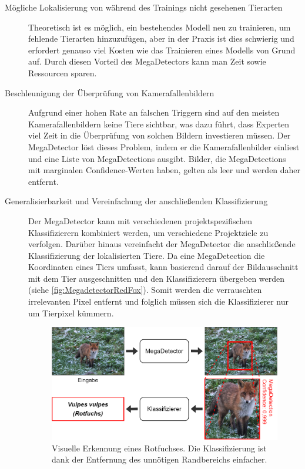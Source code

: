 \begin{description}
	\item[Mögliche Lokalisierung von während des Trainings nicht gesehenen Tierarten]
	
	Theoretisch ist es möglich, ein bestehendes Modell neu zu trainieren, um fehlende Tierarten hinzuzufügen, aber in der Praxis ist dies schwierig und erfordert genauso viel Kosten wie das Trainieren eines Modells von Grund auf. Durch diesen Vorteil des MegaDetectors kann man Zeit sowie Ressourcen sparen.
	
	\item[Beschleunigung der Überprüfung von Kamerafallenbildern]
	
	
	Aufgrund einer hohen Rate an falschen Triggern sind auf den meisten Kamerafallenbildern keine Tiere sichtbar, was dazu führt, dass Experten viel Zeit in die Überprüfung von solchen Bildern investieren müssen.	Der MegaDetector löst dieses Problem, indem er die Kamerafallenbilder einliest und eine Liste von MegaDetections ausgibt. Bilder, die MegaDetections mit marginalen Confidence-Werten haben, gelten als leer und werden daher entfernt.
	
	\item[Generalisierbarkeit und Vereinfachung der anschließenden Klassifizierung]
	
	Der MegaDetector kann mit verschiedenen projektspezifischen Klassifizierern kombiniert werden, um verschiedene Projektziele zu verfolgen. Darüber hinaus vereinfacht der MegaDetector die anschließende Klassifizierung der lokalisierten Tiere. Da eine MegaDetection die Koordinaten eines Tiers umfasst, kann basierend darauf der Bildausschnitt mit dem Tier ausgeschnitten und den Klassifizierern übergeben werden (siehe \autoref{fig:MegadetectorRedFox}). Somit werden die verrauschten irrelevanten Pixel entfernt und folglich müssen sich die Klassifizierer nur um Tierpixel kümmern.
	
	\begin{figure}[!h]
		\centering
		\includegraphics[width=\linewidth]{images/MegadetectorRedFox}
		\caption{Visuelle Erkennung eines Rotfuchses. Die Klassifizierung ist dank der Entfernung des unnötigen Randbereichs einfacher.}
		\label{fig:MegadetectorRedFox}
	\end{figure}
	

\end{description}
